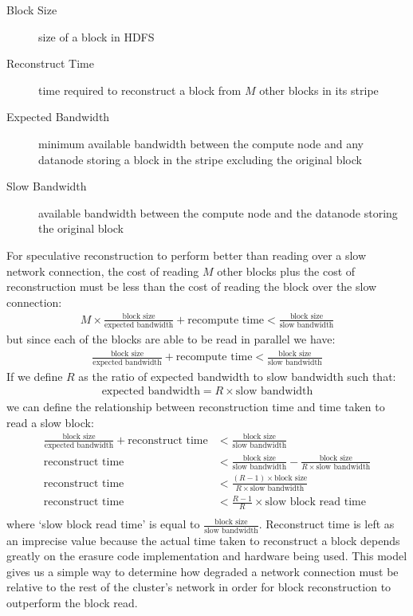 \documentclass{ucetd}
\newcommand{\eqbegin}{\begin{equation*} \begin{aligned}}
\newcommand{\eqend}{\end{aligned} \end{equation*}}
\begin{document}
\begin{description}
    \item[Block Size]%
        size of a block in HDFS
    \item[Reconstruct Time]%
        time required to reconstruct a block from $M$ other blocks in its stripe
    \item[Expected Bandwidth]%
        minimum available bandwidth between the compute node and any datanode
        storing a block in the stripe excluding the original block
    \item[Slow Bandwidth]%
        available bandwidth between the compute node and the datanode storing
        the original block
\end{description}

For speculative reconstruction to perform better than reading over a slow network
connection, the cost of reading $M$ other blocks plus the cost of reconstruction
must be less than the cost of reading the block over the slow connection:
\eqbegin
    M \times \frac{\text{block size}}{\text{expected bandwidth}} + \text{recompute time}
    < \frac{\text{block size}}{\text{slow bandwidth}}
\eqend
but since each of the blocks are able to be read in parallel we have:
\eqbegin
    \frac{\text{block size}}{\text{expected bandwidth}} + \text{recompute time}
    < \frac{\text{block size}}{\text{slow bandwidth}}
\eqend
If we define $R$ as the ratio of expected bandwidth to slow bandwidth such that:
\eqbegin
\text{expected bandwidth} = R \times \text{slow bandwidth}
\eqend
we can define the relationship between reconstruction time and time taken to
read a slow block:
\eqbegin
    \frac{\text{block size}}{\text{expected bandwidth}} + \text{reconstruct time}
    &< \frac{\text{block size}}{\text{slow bandwidth}} \\
    \text{reconstruct time}
    &< \frac{\text{block size}}{\text{slow bandwidth}} - \frac{
        \text{block size}}{R \times \text{slow bandwidth}} \\
    \text{reconstruct time}
    &< \frac{(R - 1) \times \text{block size}}{R \times \text{slow bandwidth}} \\
    \text{reconstruct time}
    &< \frac{R - 1}{R} \times \text{slow block read time} \\
\eqend
where `slow block read time' is equal to $\frac{\text{block size}}{\text{slow
bandwidth}}$. Reconstruct time is left as an imprecise value because the actual
time taken to reconstruct a block depends greatly on the erasure code
implementation and hardware being used. This model gives us a simple way to
determine how degraded a network connection must be relative to the rest of the
cluster's network in order for block reconstruction to outperform the block
read.
\end{document}
